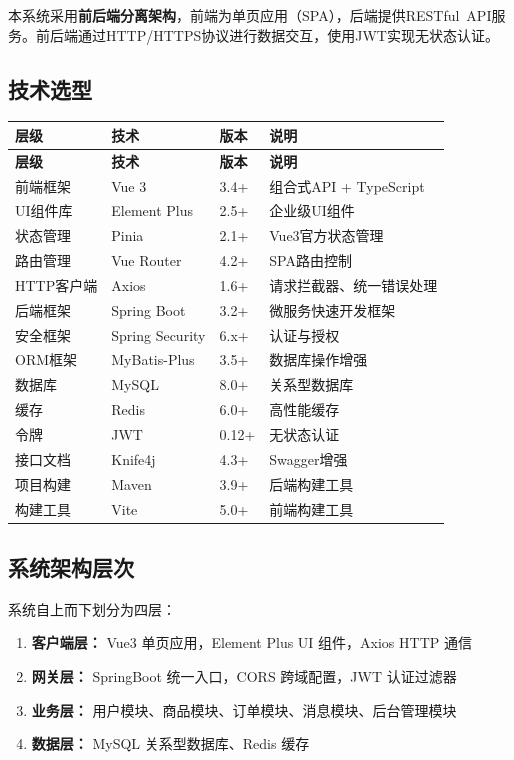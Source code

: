 \documentclass[12pt,a4paper,UTF8]{ctexart}
\begin{document}
本系统采用\textbf{前后端分离架构}，前端为单页应用（SPA），后端提供RESTful~API服务。前后端通过HTTP/HTTPS协议进行数据交互，使用JWT实现无状态认证。

\subsection{技术选型}

\begin{longtable}{p{}|p{}|p{}|p{}}
    \toprule
    \textbf{层级} & \textbf{技术} & \textbf{版本} & \textbf{说明} \\
    \midrule
    \endfirsthead
    \toprule
    \textbf{层级} & \textbf{技术} & \textbf{版本} & \textbf{说明} \\
    \midrule
    \endhead
    \bottomrule
    \endfoot

    前端框架 & Vue 3 & 3.4+ & 组合式API + TypeScript \\
    UI组件库 & Element Plus & 2.5+ & 企业级UI组件 \\
    状态管理 & Pinia & 2.1+ & Vue3官方状态管理 \\
    路由管理 & Vue Router & 4.2+ & SPA路由控制 \\
    HTTP客户端 & Axios & 1.6+ & 请求拦截器、统一错误处理 \\
    后端框架 & Spring Boot & 3.2+ & 微服务快速开发框架 \\
    安全框架 & Spring Security & 6.x+ & 认证与授权 \\
    ORM框架 & MyBatis-Plus & 3.5+ & 数据库操作增强 \\
    数据库 & MySQL & 8.0+ & 关系型数据库 \\
    缓存 & Redis & 6.0+ & 高性能缓存 \\
    令牌 & JWT & 0.12+ & 无状态认证 \\
    接口文档 & Knife4j & 4.3+ & Swagger增强 \\
    项目构建 & Maven & 3.9+ & 后端构建工具 \\
    构建工具 & Vite & 5.0+ & 前端构建工具 \\
\end{longtable}

\subsection{系统架构层次}

系统自上而下划分为四层：

\begin{enumerate}[itemsep=5pt]
    \item \textbf{客户端层：} Vue3 单页应用，Element Plus UI 组件，Axios HTTP 通信
    \item \textbf{网关层：} SpringBoot 统一入口，CORS 跨域配置，JWT 认证过滤器
    \item \textbf{业务层：} 用户模块、商品模块、订单模块、消息模块、后台管理模块
    \item \textbf{数据层：} MySQL 关系型数据库、Redis 缓存
\end{enumerate}
\end{document}
